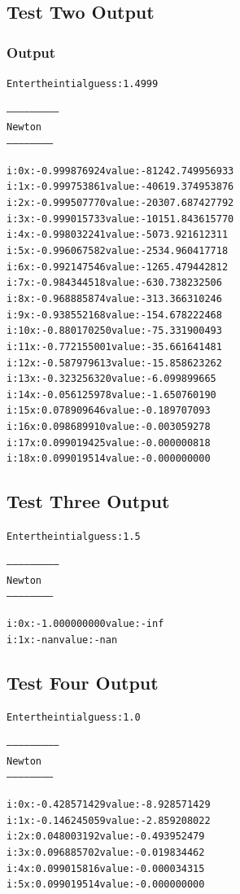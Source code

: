 \documentclass[11pt]{article} %
\begin{document}
\subsection*{Test Two Output}
\subsubsection*{Output}
\begin{alltt}
Enter the intial guess: 1.4999

--------------------------
 Newton
 -----------------------


i: 0	x: -0.999876924	value: -81242.749956933
i: 1	x: -0.999753861	value: -40619.374953876
i: 2	x: -0.999507770	value: -20307.687427792
i: 3	x: -0.999015733	value: -10151.843615770
i: 4	x: -0.998032241	value: -5073.921612311
i: 5	x: -0.996067582	value: -2534.960417718
i: 6	x: -0.992147546	value: -1265.479442812
i: 7	x: -0.984344518	value: -630.738232506
i: 8	x: -0.968885874	value: -313.366310246
i: 9	x: -0.938552168	value: -154.678222468
i: 10	x: -0.880170250	value: -75.331900493
i: 11	x: -0.772155001	value: -35.661641481
i: 12	x: -0.587979613	value: -15.858623262
i: 13	x: -0.323256320	value: -6.099899665
i: 14	x: -0.056125978	value: -1.650760190
i: 15	x: 0.078909646	value: -0.189707093
i: 16	x: 0.098689910	value: -0.003059278
i: 17	x: 0.099019425	value: -0.000000818
i: 18	x: 0.099019514	value: -0.000000000

\end{alltt}


\subsection*{Test Three Output}
\begin{alltt}

Enter the intial guess: 1.5

--------------------------
 Newton
 -----------------------


i: 0	x: -1.000000000	value: -inf
i: 1	x: -nan	value: -nan

\end{alltt}


\subsection*{Test Four Output}
\begin{alltt}
Enter the intial guess: 1.0

--------------------------
 Newton
 -----------------------


i: 0	x: -0.428571429	value: -8.928571429
i: 1	x: -0.146245059	value: -2.859208022
i: 2	x: 0.048003192	value: -0.493952479
i: 3	x: 0.096885702	value: -0.019834462
i: 4	x: 0.099015816	value: -0.000034315
i: 5	x: 0.099019514	value: -0.000000000

\end{alltt}
\end{document}
